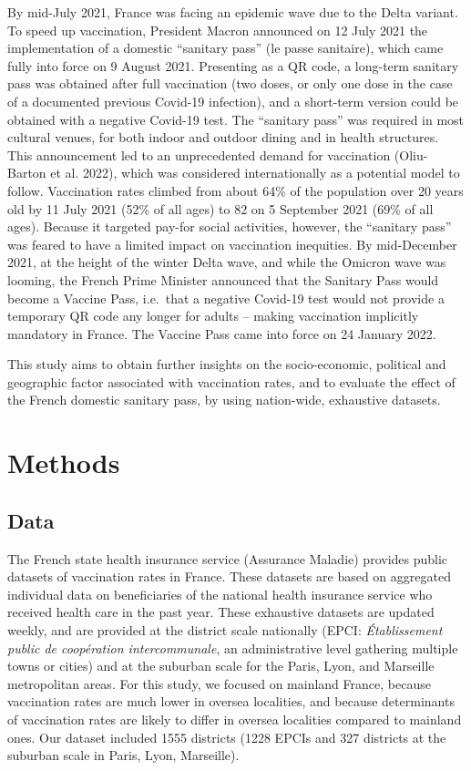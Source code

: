 \documentclass[
]{article}
\begin{document}
By mid-July 2021, France was facing an epidemic wave due to the Delta
variant. To speed up vaccination, President Macron announced on 12 July
2021 the implementation of a domestic ``sanitary pass'' (le passe
sanitaire), which came fully into force on 9 August 2021. Presenting as
a QR code, a long-term sanitary pass was obtained after full vaccination
(two doses, or only one dose in the case of a documented previous
Covid-19 infection), and a short-term version could be obtained with a
negative Covid-19 test. The ``sanitary pass'' was required in most
cultural venues, for both indoor and outdoor dining and in health
structures. This announcement led to an unprecedented demand for
vaccination (Oliu-Barton et al. 2022), which was considered
internationally as a potential model to follow. Vaccination rates
climbed from about 64\% of the population over 20 years old by 11 July
2021 (52\% of all ages) to 82 on 5 September 2021 (69\% of all ages).
Because it targeted pay-for social activities, however, the ``sanitary
pass'' was feared to have a limited impact on vaccination inequities. By
mid-December 2021, at the height of the winter Delta wave, and while the
Omicron wave was looming, the French Prime Minister announced that the
Sanitary Pass would become a Vaccine Pass, i.e.~that a negative Covid-19
test would not provide a temporary QR code any longer for adults --
making vaccination implicitly mandatory in France. The Vaccine Pass came
into force on 24 January 2022.

This study aims to obtain further insights on the socio-economic,
political and geographic factor associated with vaccination rates, and
to evaluate the effect of the French domestic sanitary pass, by using
nation-wide, exhaustive datasets.

\hypertarget{methods}{%
\section{Methods}\label{methods}}

\hypertarget{data}{%
\subsection{Data}\label{data}}

The French state health insurance service (Assurance Maladie) provides
public datasets of vaccination rates in France. These datasets are based
on aggregated individual data on beneficiaries of the national health
insurance service who received health care in the past year. These
exhaustive datasets are updated weekly, and are provided at the district
scale nationally (EPCI: \emph{Établissement public de coopération
intercommunale}, an administrative level gathering multiple towns or
cities) and at the suburban scale for the Paris, Lyon, and Marseille
metropolitan areas. For this study, we focused on mainland France,
because vaccination rates are much lower in oversea localities, and
because determinants of vaccination rates are likely to differ in
oversea localities compared to mainland ones. Our dataset included 1555
districts (1228 EPCIs and 327 districts at the suburban scale in Paris,
Lyon, Marseille).
\end{document}
